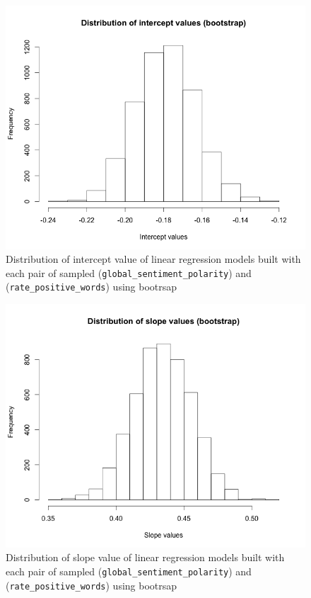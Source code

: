 \begin{figure}[h!]
\centering
\includegraphics[width=0.7\linewidth]{images/bootsrap_intercept}
\caption{Distribution of intercept value of linear regression models built with each pair of sampled (\texttt{global\_sentiment\_polarity})  and  (\texttt{rate\_positive\_words}) using bootrsap}
\label{fig:bootsrap_intercept}
\end{figure}


\begin{figure}[h!]
\centering
\includegraphics[width=0.7\linewidth]{images/bootsrap_slope}
\caption{Distribution of slope value of linear regression models built with each pair of sampled (\texttt{global\_sentiment\_polarity})  and  (\texttt{rate\_positive\_words}) using bootrsap}
\label{fig:bootsrap_slope}
\end{figure}



